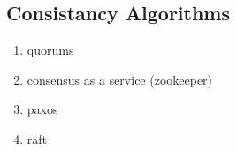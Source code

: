 \subsection{Consistancy Algorithms}

\begin{enumerate}
	\item quorums
	\item consensus as a service (zookeeper)
	\item paxos
	\item raft
\end{enumerate}
